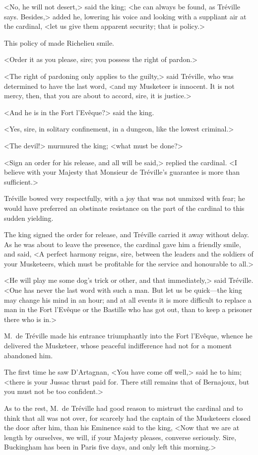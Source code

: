<No, he will not desert,> said the king; <he can always be found, as Tréville says. Besides,> added he, lowering his voice and looking with a suppliant air at the cardinal, <let us give them apparent security; that is policy.> 

This policy of  made Richelieu smile. 

<Order it as you please, sire; you possess the right of pardon.> 

<The right of pardoning only applies to the guilty,> said Tréville, who was determined to have the last word, <and my Musketeer is innocent. It is not mercy, then, that you are about to accord, sire, it is justice.> 

<And he is in the Fort l'Evêque?> said the king. 

<Yes, sire, in solitary confinement, in a dungeon, like the lowest criminal.> 

<The devil!> murmured the king; <what must be done?> 

<Sign an order for his release, and all will be said,> replied the cardinal. <I believe with your Majesty that Monsieur de Tréville's guarantee is more than sufficient.> 

Tréville bowed very respectfully, with a joy that was not unmixed with fear; he would have preferred an obstinate resistance on the part of the cardinal to this sudden yielding. 

The king signed the order for release, and Tréville carried it away without delay. As he was about to leave the presence, the cardinal gave him a friendly smile, and said, <A perfect harmony reigns, sire, between the leaders and the soldiers of your Musketeers, which must be profitable for the service and honourable to all.> 

<He will play me some dog's trick or other, and that immediately,> said Tréville. <One has never the last word with such a man. But let us be quick—the king may change his mind in an hour; and at all events it is more difficult to replace a man in the Fort l'Evêque or the Bastille who has got out, than to keep a prisoner there who is in.> 

M.~de Tréville made his entrance triumphantly into the Fort l'Evêque, whence he delivered the Musketeer, whose peaceful indifference had not for a moment abandoned him. 

The first time he saw D'Artagnan, <You have come off well,> said he to him; <there is your Jussac thrust paid for. There still remains that of Bernajoux, but you must not be too confident.> 

As to the rest, M.~de Tréville had good reason to mistrust the cardinal and to think that all was not over, for scarcely had the captain of the Musketeers closed the door after him, than his Eminence said to the king, <Now that we are at length by ourselves, we will, if your Majesty pleases, converse seriously. Sire, Buckingham has been in Paris five days, and only left this morning.> 